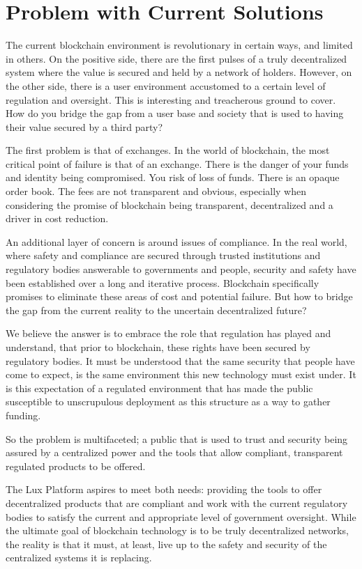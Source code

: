 \documentclass[11pt]{article}
\begin{document}
\section{Problem with Current Solutions}

The current blockchain environment is revolutionary in certain ways, and limited in others. On the positive side, there are the first pulses of a truly decentralized system where the value is secured and held by a network of holders. However, on the other side, there is a user environment accustomed to a certain level of regulation and oversight. This is interesting and treacherous ground to cover.  How do you bridge the gap from a user base and society that is used to having their value secured by a third party?


The first problem is that of exchanges. In the world of blockchain, the most critical point of failure is that of an exchange. There is the danger of your funds and identity being compromised. You risk of loss of funds. There is an opaque order book. The fees are not transparent and obvious, especially when considering the promise of blockchain being transparent, decentralized and a driver in cost reduction.


An additional layer of concern is around issues of compliance. In the real world, where safety and compliance are secured through trusted institutions and regulatory bodies answerable to governments and people, security and safety have been established over a long and iterative process. Blockchain specifically promises to eliminate these areas of cost and potential failure. But how to bridge the gap from the current reality to the uncertain decentralized future?


We believe the answer is to embrace the role that regulation has played and understand, that prior to blockchain, these rights have been secured by regulatory bodies. It must be understood that the same security that people have come to expect, is the same environment this new technology must exist under. It is this expectation of a regulated environment that has made the public susceptible to unscrupulous deployment as this structure as a way to gather funding.


So the problem is multifaceted; a public that is used to trust and security being assured by a centralized power and the tools that allow compliant, transparent regulated products to be offered.


The Lux Platform aspires to meet both needs: providing the tools to offer decentralized products that are compliant and work with the current regulatory bodies to satisfy the current and appropriate level of government oversight. While the ultimate goal of blockchain technology is to be truly decentralized networks, the reality is that it must, at least, live up to the safety and security of the centralized systems it is replacing.
\end{document}
